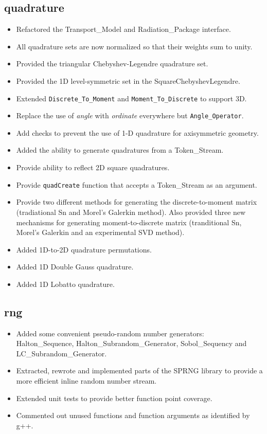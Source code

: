 \documentclass[note]{ResearchNote}
\begin{document}
\subsection{quadrature}
\label{changes:quadrature}
\begin{itemize}
\item Refactored the \textsf{Transport\_Model} and
  \textsf{Radiation\_Package} interface.
\item All quadrature sets are now normalized so that their weights sum
  to unity.
\item Provided the triangular Chebyshev-Legendre quadrature set.
\item Provided the 1D level-symmetric set in the
  \textsf{SquareChebyshevLegendre}. 
\item Extended \texttt{Discrete\_To\_Moment} and 
  \texttt{Moment\_To\_Discrete} to support 3D.
\item Replace the use of {\it angle} with {\it ordinate} everywhere
  but \texttt{Angle\_Operator}.
\item Add checks to prevent the use of 1-D quadrature for axisymmetric
  geometry. 
\item Added the ability to generate quadratures from a
  \textsf{Token\_Stream}. 
\item Provide ability to reflect 2D square quadratures.
\item Provide \texttt{quadCreate} function that accepts a
  \textsf{Token\_Stream} as an argument.  
\item Provide two different methods for generating the
  discrete-to-moment matrix (tradiational Sn and Morel's Galerkin
  method).  Also provided three new mechanisms for generating
  moment-to-discrete matrix (tranditional Sn, Morel's Galerkin and an
  experimental SVD method).
\item Added 1D-to-2D quadrature permutations.
\item Added 1D Double Gauss quadrature.
\item Added 1D Lobatto quadrature.
\end{itemize}

\subsection{rng}
\label{changes:rng}
\begin{itemize}
\item Added some convenient pseudo-random number generators:
  \textsf{Halton\_Sequence}, \textsf{Halton\_Subrandom\_Generator},
  \textsf{Sobol\_Sequency} and \textsf{LC\_Subrandom\_Generator}.
\item Extracted, rewrote and implemented parts of the SPRNG library to
  provide a more efficient inline random number stream.
\item Extended unit tests to provide better function point coverage.
\item Commented out unused functions and function arguments as
  identified by g++.
\end{itemize}
\end{document}
